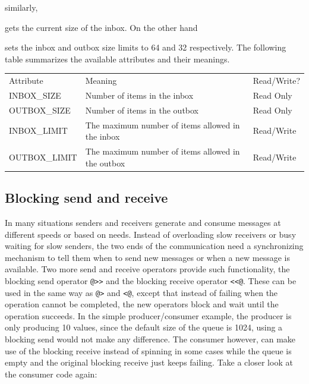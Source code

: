 
\noindent similarly, 


\noindent
gets the current size of the inbox. On the other hand


sets the inbox and outbox size limits to 64 and 32 respectively. The following
table summarizes the available attributes and their meanings.


\bigskip

\begin{flushleft}
\tablehead{}
\begin{supertabular}{m{2.0941598in}m{1.9087598in}m{1.9108598in}}
Attribute &
Meaning &
Read/Write?\\
INBOX\_SIZE &
Number of items in the inbox &
Read Only\\
OUTBOX\_SIZE &
Number of items in the outbox &
Read Only\\
INBOX\_LIMIT &
The maximum number of items allowed in the inbox &
Read/Write\\
OUTBOX\_LIMIT &
The maximum number of items allowed in the outbox &
Read/Write\\
\end{supertabular}
\end{flushleft}


\subsection{Blocking send and receive}

In many situations senders and receivers generate and consume messages at
different speeds or based on needs. Instead of overloading slow receivers or
busy waiting for slow senders, the two ends of the communication need a
synchronizing mechanism to tell them when to send new messages or when a new
message is available. Two more send and receive operators provide such
functionality, the blocking send operator \texttt{@>{}>} and the blocking
receive operator \texttt{<{}<@}.  These can be used in the same way as
\texttt{@>} and \texttt{{<}@}, except that instead of failing when the operation
cannot be completed, the new operators block and wait until the operation
succeeds. In the simple producer/consumer example, the producer is only
producing 10 values, since the default size of the queue is 1024, using a
blocking send would not make any difference. The consumer however, can make use
of the blocking receive instead of spinning in some cases while the queue is
empty and the original blocking receive just keeps failing.  Take a closer look
at the consumer code again:


